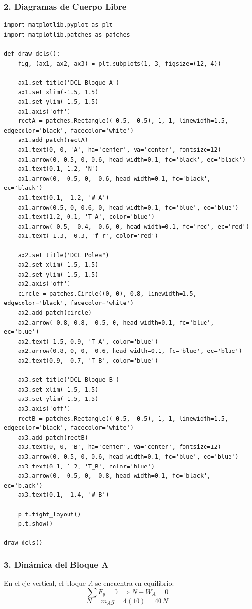 \documentclass[12pt, a4paper]{article}
\begin{document}
\subsubsection*{2. Diagramas de Cuerpo Libre}
\begin{lstlisting}
import matplotlib.pyplot as plt
import matplotlib.patches as patches

def draw_dcls():
    fig, (ax1, ax2, ax3) = plt.subplots(1, 3, figsize=(12, 4))
    
    ax1.set_title("DCL Bloque A")
    ax1.set_xlim(-1.5, 1.5)
    ax1.set_ylim(-1.5, 1.5)
    ax1.axis('off')
    rectA = patches.Rectangle((-0.5, -0.5), 1, 1, linewidth=1.5, edgecolor='black', facecolor='white')
    ax1.add_patch(rectA)
    ax1.text(0, 0, 'A', ha='center', va='center', fontsize=12)
    ax1.arrow(0, 0.5, 0, 0.6, head_width=0.1, fc='black', ec='black')
    ax1.text(0.1, 1.2, 'N')
    ax1.arrow(0, -0.5, 0, -0.6, head_width=0.1, fc='black', ec='black')
    ax1.text(0.1, -1.2, 'W_A')
    ax1.arrow(0.5, 0, 0.6, 0, head_width=0.1, fc='blue', ec='blue')
    ax1.text(1.2, 0.1, 'T_A', color='blue')
    ax1.arrow(-0.5, -0.4, -0.6, 0, head_width=0.1, fc='red', ec='red')
    ax1.text(-1.3, -0.3, 'f_r', color='red')
    
    ax2.set_title("DCL Polea")
    ax2.set_xlim(-1.5, 1.5)
    ax2.set_ylim(-1.5, 1.5)
    ax2.axis('off')
    circle = patches.Circle((0, 0), 0.8, linewidth=1.5, edgecolor='black', facecolor='white')
    ax2.add_patch(circle)
    ax2.arrow(-0.8, 0.8, -0.5, 0, head_width=0.1, fc='blue', ec='blue')
    ax2.text(-1.5, 0.9, 'T_A', color='blue')
    ax2.arrow(0.8, 0, 0, -0.6, head_width=0.1, fc='blue', ec='blue')
    ax2.text(0.9, -0.7, 'T_B', color='blue')
    
    ax3.set_title("DCL Bloque B")
    ax3.set_xlim(-1.5, 1.5)
    ax3.set_ylim(-1.5, 1.5)
    ax3.axis('off')
    rectB = patches.Rectangle((-0.5, -0.5), 1, 1, linewidth=1.5, edgecolor='black', facecolor='white')
    ax3.add_patch(rectB)
    ax3.text(0, 0, 'B', ha='center', va='center', fontsize=12)
    ax3.arrow(0, 0.5, 0, 0.6, head_width=0.1, fc='blue', ec='blue')
    ax3.text(0.1, 1.2, 'T_B', color='blue')
    ax3.arrow(0, -0.5, 0, -0.8, head_width=0.1, fc='black', ec='black')
    ax3.text(0.1, -1.4, 'W_B')
    
    plt.tight_layout()
    plt.show()

draw_dcls()
\end{lstlisting}

\subsubsection*{3. Dinámica del Bloque A}
En el eje vertical, el bloque $A$ se encuentra en equilibrio:
$$\sum F_y = 0 \implies N - W_A = 0$$
$$N = m_A g = 4(10) = 40 \, \si{N}$$
\end{document}
